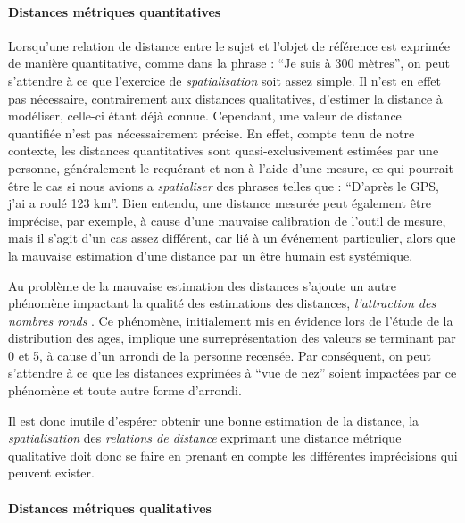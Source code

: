 \paragraph{Distances métriques quantitatives}

Lorsqu'une relation de distance entre le sujet et l'objet de référence
est exprimée de manière quantitative, comme dans la phrase :
\enquote{Je suis à 300 mètres}, on peut s'attendre à ce que l'exercice
de \emph{spatialisation} soit assez simple. Il n'est en effet pas
nécessaire, contrairement aux distances qualitatives, d'estimer la
distance à modéliser, celle-ci étant déjà connue. Cependant, une
valeur de distance quantifiée n'est pas nécessairement précise. En
effet, compte tenu de notre contexte, les distances quantitatives sont
quasi-exclusivement estimées par une personne, généralement le
requérant et non à l'aide d'une mesure, ce qui pourrait être le cas si
nous avions a \emph{spatialiser} des phrases telles que :
\enquote{D'après le GPS, j'ai a roulé 123 km}. Bien entendu, une
distance mesurée peut également être imprécise, par exemple, à cause
d'une mauvaise calibration de l'outil de mesure, mais il s'agit d'un
cas assez différent, car lié à un événement particulier, alors que la
mauvaise estimation d'une distance par un être humain est systémique.

Au problème de la mauvaise estimation des distances s'ajoute un autre
phénomène impactant la qualité des estimations des distances,
\emph{l'attraction des nombres ronds} \autocite{Durand1961}. Ce
phénomène, initialement mis en évidence lors de l'étude de la
distribution des ages, implique une surreprésentation des valeurs se
terminant par 0 et 5, à cause d'un arrondi de la personne
recensée. Par conséquent, on peut s'attendre à ce que les distances
exprimées à \enquote{vue de nez} soient impactées par ce phénomène et
toute autre forme d'arrondi.

Il est donc inutile d'espérer obtenir une bonne estimation de la
distance, la \emph{spatialisation} des \emph{relations de distance}
exprimant une distance métrique qualitative doit donc se faire en
prenant en compte les différentes imprécisions qui peuvent exister.

\paragraph{Distances métriques qualitatives}


